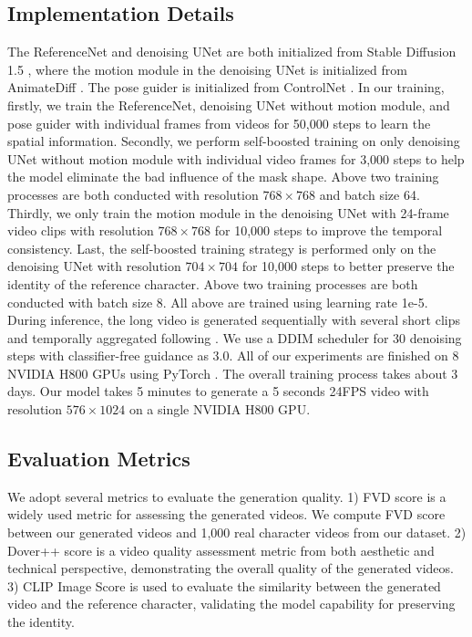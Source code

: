 \subsection{Implementation Details}
The ReferenceNet and denoising UNet are both initialized from Stable Diffusion 1.5 \cite{rombach2022high}, where the motion module in the denoising UNet is initialized from AnimateDiff \cite{guo2024animatediff}.
The pose guider is initialized from ControlNet \cite{zhang2023adding}.
In our training, firstly, we train the ReferenceNet, denoising UNet without motion module, and pose guider with individual frames from videos for 50,000 steps to learn the spatial information.
Secondly, we perform self-boosted training on only denoising UNet without motion module with individual video frames for 3,000 steps to help the model eliminate the bad influence of the mask shape.
Above two training processes are both conducted with resolution $768 \times 768$ and batch size 64.
Thirdly, we only train the motion module in the denoising UNet with 24-frame video clips with resolution $768 \times 768$ for 10,000 steps to improve the temporal consistency.
Last, the self-boosted training strategy is performed only on the denoising UNet with resolution $704 \times 704$ for 10,000 steps to better preserve the identity of the reference character.
Above two training processes are both conducted with batch size 8.
All above are trained using learning rate 1e-5.
During inference, the long video is generated sequentially with several short clips and temporally aggregated following \cite{tseng2023edge}.
We use a DDIM \cite{song2020denoising} scheduler for 30 denoising steps with classifier-free guidance \cite{ho2021classifierfree} as 3.0.
All of our experiments are finished on 8 NVIDIA H800 GPUs using PyTorch \cite{paszke2019pytorch}.
The overall training process takes about 3 days.
Our model takes 5 minutes to generate a 5 seconds 24FPS video with resolution $576 \times 1024$ on a single NVIDIA H800 GPU.

\subsection{Evaluation Metrics}
We adopt several metrics to evaluate the generation quality.
1) FVD \cite{unterthiner2018towards} score is a widely used metric for assessing the generated videos. We compute FVD score between our generated videos and 1,000 real character videos from our dataset.
2) Dover++ \cite{wu2023exploring} score is a video quality assessment metric from both aesthetic and technical perspective, demonstrating the overall quality of the generated videos.
3) CLIP Image Score \cite{radford2021learning} is used to evaluate the similarity between the generated video and the reference character, validating the model capability for preserving the identity.


